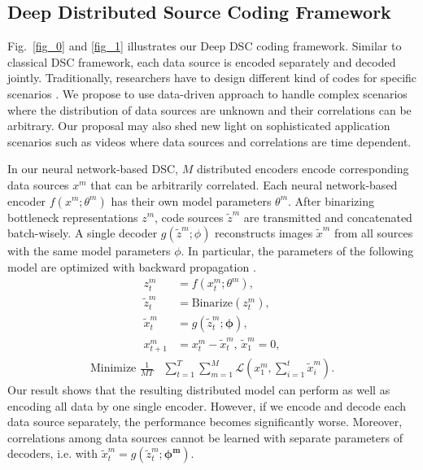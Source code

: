 \documentclass[10pt,twocolumn,letterpaper]{article}
\begin{document}
\subsection{Deep Distributed Source Coding Framework}
Fig.~\ref{fig_0} and \ref{fig_1} illustrates our Deep DSC coding framework. Similar to classical DSC framework, each data source is encoded separately and decoded jointly. Traditionally, researchers have to design different kind of codes for specific scenarios \cite{schonberg2004distributed}. We propose to use data-driven approach to handle complex scenarios where the distribution of data sources are unknown and their correlations can be arbitrary. Our proposal may also shed new light on sophisticated application scenarios such as videos where data sources and correlations are time dependent.

In our neural network-based DSC, %
$M$ distributed encoders encode corresponding data sources $x^m$ that can be arbitrarily correlated. Each neural network-based encoder $f(x^m;\theta^m)$ has their own model parameters $\theta^m$. After binarizing bottleneck representations $z^m$, code sources $\tilde{z}^m$ are transmitted and concatenated batch-wisely. A single decoder $g(\tilde{z}^m;\phi)$ reconstructs images $\tilde{x}^m$ from all sources with the same model parameters $\phi$. 
In particular, the parameters of the following model are optimized with backward propagation \cite{rumelhart1988learning}. 
\begin{align}
z_t^m &= f(x_t^m;\theta^m),\\
\tilde{z}_t^m &= \text{Binarize}(z_t^m),\\
\tilde{x}_t^{m} &= g(\tilde{z}_t^{m};\bm{\phi}),\\
x_{t+1}^{m} &= x_t^{m}-\tilde{x}_t^{m}\text{, }\tilde{x}_1^{m}=0,
\end{align}
\begin{align}
\text{Minimize } \frac{1}{MT}&\sum_{t=1}^{T}\sum_{m=1}^{M}\mathcal{L}(x_1^m,\sum_{i=1}^{t}\tilde{x}_i^m).
\end{align}
Our result shows that the resulting distributed model can perform as well as encoding all data by one single encoder. However, if we encode and decode each data source separately, the performance becomes significantly worse. Moreover, correlations among data sources cannot be learned with separate parameters of decoders, i.e. with 
$\tilde{x}_t^{m} = g(\tilde{z}_t^{m};\bm{\phi^m})$.
\end{document}
